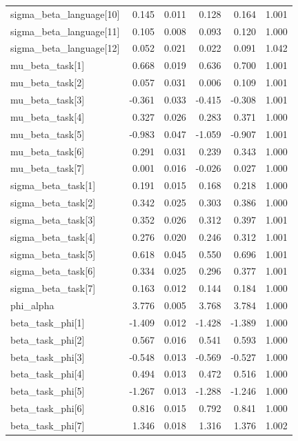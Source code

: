 \begin{tabular}{lrrrrr}
sigma\_beta\_language[10] & 0.145 & 0.011 & 0.128 & 0.164 & 1.001 \\
sigma\_beta\_language[11] & 0.105 & 0.008 & 0.093 & 0.120 & 1.000 \\
sigma\_beta\_language[12] & 0.052 & 0.021 & 0.022 & 0.091 & 1.042 \\
mu\_beta\_task[1] & 0.668 & 0.019 & 0.636 & 0.700 & 1.001 \\
mu\_beta\_task[2] & 0.057 & 0.031 & 0.006 & 0.109 & 1.001 \\
mu\_beta\_task[3] & -0.361 & 0.033 & -0.415 & -0.308 & 1.001 \\
mu\_beta\_task[4] & 0.327 & 0.026 & 0.283 & 0.371 & 1.000 \\
mu\_beta\_task[5] & -0.983 & 0.047 & -1.059 & -0.907 & 1.001 \\
mu\_beta\_task[6] & 0.291 & 0.031 & 0.239 & 0.343 & 1.000 \\
mu\_beta\_task[7] & 0.001 & 0.016 & -0.026 & 0.027 & 1.000 \\
sigma\_beta\_task[1] & 0.191 & 0.015 & 0.168 & 0.218 & 1.000 \\
sigma\_beta\_task[2] & 0.342 & 0.025 & 0.303 & 0.386 & 1.000 \\
sigma\_beta\_task[3] & 0.352 & 0.026 & 0.312 & 0.397 & 1.001 \\
sigma\_beta\_task[4] & 0.276 & 0.020 & 0.246 & 0.312 & 1.001 \\
sigma\_beta\_task[5] & 0.618 & 0.045 & 0.550 & 0.696 & 1.001 \\
sigma\_beta\_task[6] & 0.334 & 0.025 & 0.296 & 0.377 & 1.001 \\
sigma\_beta\_task[7] & 0.163 & 0.012 & 0.144 & 0.184 & 1.000 \\
phi\_alpha & 3.776 & 0.005 & 3.768 & 3.784 & 1.000 \\
beta\_task\_phi[1] & -1.409 & 0.012 & -1.428 & -1.389 & 1.000 \\
beta\_task\_phi[2] & 0.567 & 0.016 & 0.541 & 0.593 & 1.000 \\
beta\_task\_phi[3] & -0.548 & 0.013 & -0.569 & -0.527 & 1.000 \\
beta\_task\_phi[4] & 0.494 & 0.013 & 0.472 & 0.516 & 1.000 \\
beta\_task\_phi[5] & -1.267 & 0.013 & -1.288 & -1.246 & 1.000 \\
beta\_task\_phi[6] & 0.816 & 0.015 & 0.792 & 0.841 & 1.000 \\
beta\_task\_phi[7] & 1.346 & 0.018 & 1.316 & 1.376 & 1.002 \\
\bottomrule
\end{tabular}
